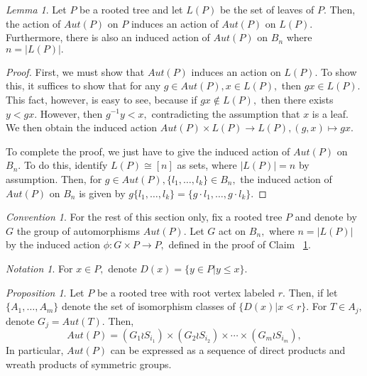\documentclass[10 pt]{amsart}
\theoremstyle{plain}
\theoremstyle{definition}
\theoremstyle{remark}
\numberwithin{equation}{section}
\newtheorem{lem}[thm]{Lemma}
\newtheorem{prop}[thm]{Proposition}
\theoremstyle{remark}
\newtheorem{note}[thm]{Notation}
\newtheorem{convention}[thm]{Convention}
\begin{document}
\begin{lem}
\label{lem:induced_tree_action}
Let $P$ be a rooted tree and let $L(P)$ be the set of leaves of $P.$ Then, the action of $Aut(P)$ on $P$ induces an action of $Aut(P)$ on $L(P).$ Furthermore, there is also an induced action of $Aut(P)$ on $B_n$ where $n = |L(P)|.$ 
\end{lem}
\begin{proof}
First, we must show that $Aut(P)$ induces an action on $L(P).$ To show this, it suffices to show that for any $g \in Aut(P),x \in L(P),$ then $gx \in L(P).$ This fact, however, is easy to see, because if $gx \notin L(P),$ then there exists $y < gx.$ However, then $g^{-1}y < x,$ contradicting the assumption that $x$ is a leaf. We then obtain the induced action $Aut(P)\times L(P) \rightarrow L(P),(g,x)\mapsto gx.$

To complete the proof, we just have to give the induced action of $Aut(P)$ on $B_n.$ To do this, identify $L(P) \cong [n]$ as sets, where $|L(P)| = n$ by assumption. Then, for $g \in Aut(P),\{l_1,\ldots, l_k\} \in B_n,$ the induced action of $Aut(P)$ on $B_n$ is given by $g\{l_1,\ldots, l_k\} = \{g\cdot l_1,\ldots, g\cdot l_k\}.$
\end{proof}

\begin{convention}
For the rest of this section only, fix a rooted tree $P$ and denote by $G$ the group of automorphisms $Aut(P).$ Let $G$ act on $B_n,$ where $n = |L(P)|$ by the induced action $\phi:G \times P \rightarrow P,$ defined in the proof of Claim ~\ref{lem:induced_tree_action}.
\end{convention}

\begin{note}
For $x \in P,$ denote $D(x) = \{y \in P| y \leq x\}.$
\end{note}
\begin{prop}
\label{prop:automorphism_trees}
Let $P$ be a rooted tree with root vertex labeled $r$. Then, if let $\{A_1,\ldots,A_m\}$ denote the set of isomorphism classes of $\{D(x)|x\lessdot r\}.$ For $T \in A_j,$ denote $G_j = Aut(T).$ Then, 
\begin{equation}
\label{eq:level_expansion}
Aut(P) = (G_1 \wr S_{i_1}) \times (G_2 \wr S_{i_2}) \times \cdots \times (G_m\wr S_{i_m}),
\end{equation}
In particular, $Aut(P)$ can be expressed as a sequence of direct products and wreath products of symmetric groups.
\end{prop}
\end{document}
